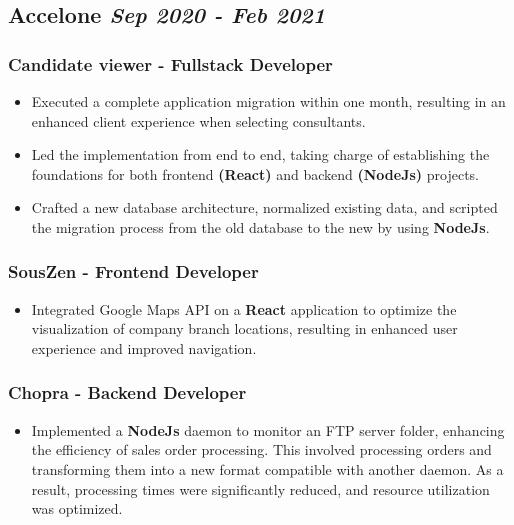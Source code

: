 \documentclass[10pt, a4paper]{article}
\begin{document}
\subsection*{Accelone \hfill \small \textit{Sep 2020 - Feb 2021}}

\subsubsection*{Candidate viewer - Fullstack Developer}
\begin{itemize}
    \setlength\itemsep{0em}
    \item Executed a complete application migration within one month, resulting in an enhanced client experience when selecting consultants.
    \item Led the implementation from end to end, taking charge of establishing the foundations for both frontend \textbf{(React)} and backend \textbf{(NodeJs)} projects.
    \item Crafted a new database architecture, normalized existing data, and scripted the migration process from the old database to the new by using \textbf{NodeJs}.
\end{itemize}

\subsubsection*{SousZen - Frontend Developer}
\begin{itemize}
    \setlength\itemsep{0em}
    \item Integrated Google Maps API on a \textbf{React} application to optimize the visualization of company branch locations, resulting in enhanced user experience and improved navigation.
\end{itemize}

\subsubsection*{Chopra - Backend Developer}
\begin{itemize}
    \setlength\itemsep{0em}
    \item Implemented a \textbf{NodeJs} daemon to monitor an FTP server folder, enhancing the efficiency of sales order processing. This involved processing orders and transforming them into a new format compatible with another daemon. As a result, processing times were significantly reduced, and resource utilization was optimized.
\end{itemize}
\end{document}
